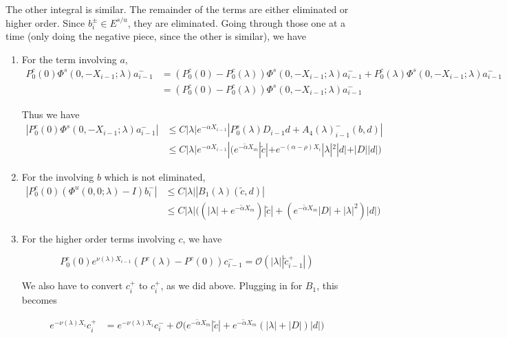 \documentclass[12pt]{article}
\begin{document}
The other integral is similar. The remainder of the terms are either eliminated or higher order. Since $b_i^\pm \in E^{s/u}$, they are eliminated.
Going through those one at a time (only doing the negative piece, since the other is similar), we have

\begin{enumerate}
\item For the term involving $a$,
\begin{align*}
P_0^c(0) \Phi^s(0, -X_{i-1}; \lambda) a_{i-1}^- &= 
(P_0^c(0) - P_0^c(\lambda)) \Phi^s(0, -X_{i-1}; \lambda) a_{i-1}^- + P_0^c(\lambda) \Phi^s(0, -X_{i-1}; \lambda) a_{i-1}^- \\
&= (P_0^c(0) - P_0^c(\lambda)) \Phi^s(0, -X_{i-1}; \lambda) a_{i-1}^-
\end{align*}

Thus we have
\begin{align*}
|P_0^c(0) \Phi^s(0, -X_{i-1}; \lambda) a_{i-1}^-| 
&\leq C |\lambda| e^{-\alpha X_{i-1}}| P_0^s(\lambda) D_{i-1} d + A_4(\lambda)_{i-1}^-(b, d)| \\
&\leq C |\lambda| e^{-\alpha X_{i-1}}| \Big( e^{-\tilde{\alpha} X_m} |\tilde{c}| + e^{-(\alpha - \rho) X_i} |\lambda|^2|d| + |D||d| \Big)
\end{align*}

\item For the involving $b$ which is not eliminated,
\begin{align*}
|P_0^c(0)  (\Phi^u(0, 0; \lambda) - I)b_i^-| &\leq C |\lambda| |B_1(\lambda)(\tilde{c}, d)| \\
&\leq  C |\lambda| \Big( (|\lambda| + e^{-\tilde{\alpha}X_m})|\tilde{c}|
+ (e^{-\tilde{\alpha}X_m}|D| 
+ |\lambda|^2)|d| \Big)
\end{align*}

\item For the higher order terms involving $c$, we have

\[
P_0^c(0) e^{\nu(\lambda) X_{i-1}} (P^c(\lambda) - P^c(0))c_{i-1}^- 
= \mathcal{O}(|\lambda||\tilde{c}_{i-1}^+|)
\]

We also have to convert $c_i^+$ to $c_i^+$, as we did above. Plugging in for $B_1$, this becomes

\begin{align*}
e^{-\nu(\lambda)X_i} c_i^+ &= e^{-\nu(\lambda)X_i} c_i^- + \mathcal{O}\Big( e^{-\tilde{\alpha} X_m} |\tilde{c}| + e^{-\tilde{\alpha} X_m}(|\lambda| + |D| ) |d| \Big) \\
\end{align*}


\end{enumerate}
\end{document}
